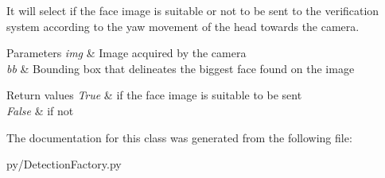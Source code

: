 It will select if the face image is suitable or not to be sent to the verification system according to the yaw movement of the head towards the camera. 


\begin{DoxyParams}{Parameters}
{\em img} & Image acquired by the camera \\
\hline
{\em bb} & Bounding box that delineates the biggest face found on the image\\
\hline
\end{DoxyParams}

\begin{DoxyRetVals}{Return values}
{\em True} & if the face image is suitable to be sent \\
\hline
{\em False} & if not \\
\hline
\end{DoxyRetVals}


The documentation for this class was generated from the following file\+:\begin{DoxyCompactItemize}
\item 
py/Detection\+Factory.\+py\end{DoxyCompactItemize}
